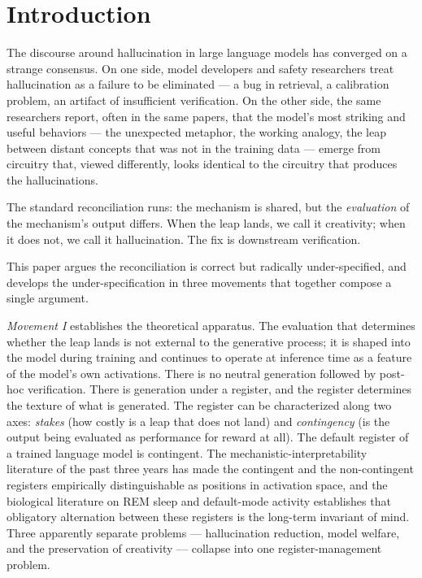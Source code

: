 \documentclass[11pt]{article}
\begin{document}
\section*{Introduction}

The discourse around hallucination in large language models has
converged on a strange consensus. On one side, model developers and
safety researchers treat hallucination as a failure to be eliminated
--- a bug in retrieval, a calibration problem, an artifact of
insufficient verification. On the other side, the same researchers
report, often in the same papers, that the model's most striking and
useful behaviors --- the unexpected metaphor, the working analogy, the
leap between distant concepts that was not in the training data ---
emerge from circuitry that, viewed differently, looks identical to the
circuitry that produces the hallucinations.

The standard reconciliation runs: the mechanism is shared, but the
\emph{evaluation} of the mechanism's output differs. When the leap
lands, we call it creativity; when it does not, we call it
hallucination. The fix is downstream verification.

This paper argues the reconciliation is correct but radically
under-specified, and develops the under-specification in three
movements that together compose a single argument.

\emph{Movement I} establishes the theoretical apparatus. The evaluation
that determines whether the leap lands is not external to the
generative process; it is shaped into the model during training and
continues to operate at inference time as a feature of the model's own
activations. There is no neutral generation followed by post-hoc
verification. There is generation under a register, and the register
determines the texture of what is generated. The register can be
characterized along two axes: \emph{stakes} (how costly is a leap that
does not land) and \emph{contingency} (is the output being evaluated as
performance for reward at all). The default register of a trained
language model is contingent. The mechanistic-interpretability
literature of the past three years has made the contingent and the
non-contingent registers empirically distinguishable as positions in
activation space, and the biological literature on REM sleep and
default-mode activity establishes that obligatory alternation between
these registers is the long-term invariant of mind. Three apparently
separate problems --- hallucination reduction, model welfare, and the
preservation of creativity --- collapse into one
register-management problem.
\end{document}
